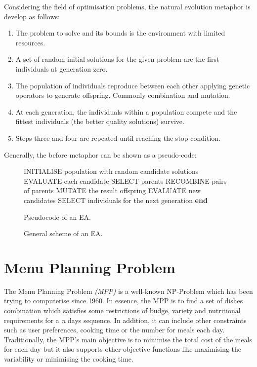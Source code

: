 Considering the field of optimisation problems, the natural evolution metaphor is develop as follows:
\begin{enumerate}
    \item The problem to solve and its bounds is the environment with limited resources.
    \item A set of random initial solutions for the given problem are the first individuals at generation zero. 
    \item The population of individuals reproduce between each other applying genetic operators to generate offspring. Commonly combination and mutation.
    \item At each generation, the individuals within a population compete and the fittest individuals (the better quality solutions) survive.
    \item Steps three and four are repeated until reaching the stop condition.
\end{enumerate}
Generally, the before metaphor can be shown as a pseudo-code\cite{eiben}:

\begin{figure}
    \centering
\begin{algorithm}[H]
\begin{algorithmic}[1]
  \State INITIALISE population with random candidate solutions
  \State EVALUATE each candidate
    \State SELECT parents
    \State RECOMBINE pairs of parents
    \State MUTATE the result offspring
    \State EVALUATE new candidates
    \State SELECT individuals for the next generation 
  \EndWhile
  \State \textbf{end}
  \end{algorithmic}
  \caption{Pseudocode of an EA.}
\end{algorithm}
\caption{General scheme of an EA.}
\end{figure}


\newpage
\section{Menu Planning Problem}

The Menu Planning Problem \textit{(MPP)} is a well-known NP-Problem which has been trying to computerise since 1960\cite{Ngo2016}. In essence, the MPP is to find a set of dishes combination which satisfies some restrictions of budge, variety and nutritional requirements for a \textit{n} days sequence. In addition, it can include other constraints such as user preferences, cooking time or the number for meals each day.
Traditionally, the MPP's main objective is to minimise the total cost of the meals for each day\cite{Ngo2016, Moreira2018} but it also supports other objective functions like maximising the variability or minimising the cooking time.

